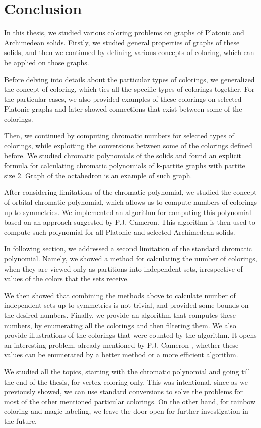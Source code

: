 \chapter*{Conclusion}

In this thesis, we studied various coloring problems on graphs of Platonic and Archimedean solids. Firstly, we studied general properties of graphs of these solids, and then we continued by defining various concepts of coloring, which can be applied on those graphs.

Before delving into details about the particular types of colorings, we generalized the concept of coloring, which ties all the specific types of colorings together. For the particular cases, we also provided examples of these colorings on selected Platonic graphs and later showed connections that exist between some of the colorings.

Then, we continued by computing chromatic numbers for selected types of colorings, while exploiting the conversions between some of the colorings defined before. We studied chromatic polynomials of the solids and found an explicit formula for calculating chromatic polynomials of k-partite graphs with partite size 2. Graph of the octahedron is an example of such graph.

After considering limitations of the chromatic polynomial, we studied the concept of orbital chromatic polynomial, which allows us to compute numbers of colorings up to symmetries. We implemented an algorithm for computing this polynomial based on an approach suggested by P.J. Cameron. This algorithm is then used to compute such polynomial for all Platonic and selected Archimedean solids.

In following section, we addressed a second limitation of the standard chromatic polynomial. Namely, we showed a method for calculating the number of colorings, when they are viewed only as partitions into independent sets, irrespective of values of the colors that the sets receive.

We then showed that combining the methods above to calculate number of independent sets up to symmetries is not trivial, and provided some bounds on the desired numbers. Finally, we provide an algorithm that computes these numbers, by enumerating all the colorings and then filtering them. We also provide illustrations of the colorings that were counted by the algorithm. It opens an interesting problem, already mentioned by P.J. Cameron \cite{cameron-countcols}, whether these values can be enumerated by a better method or a more efficient algorithm.

We studied all the topics, starting with the chromatic polynomial and going till the end of the thesis, for vertex coloring only. This was intentional, since as we previously showed, we can use standard conversions to solve the problems for most of the other mentioned particular colorings. On the other hand, for rainbow coloring and magic labeling, we leave the door open for further investigation in the future.